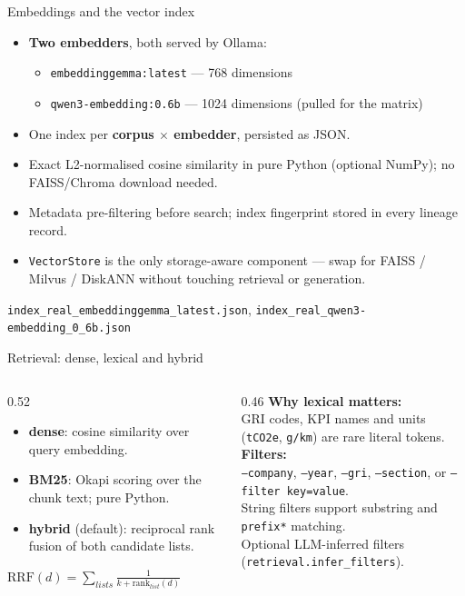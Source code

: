 \documentclass[aspectratio=169]{beamer}
\begin{document}
\begin{frame}{Embeddings and the vector index}
  \begin{itemize}
    \item \textbf{Two embedders}, both served by Ollama:
      \begin{itemize}
        \item \texttt{embeddinggemma:latest} --- 768 dimensions
        \item \texttt{qwen3-embedding:0.6b} --- 1024 dimensions (pulled for the matrix)
      \end{itemize}
    \item One index per \textbf{corpus $\times$ embedder}, persisted as JSON.
    \item Exact L2-normalised cosine similarity in pure Python (optional NumPy); no FAISS/Chroma download needed.
    \item Metadata pre-filtering before search; index fingerprint stored in every lineage record.
    \item \texttt{VectorStore} is the only storage-aware component --- swap for FAISS / Milvus / DiskANN without touching retrieval or generation.
  \end{itemize}
  \vspace{1mm}
  \small \texttt{index\_real\_embeddinggemma\_latest.json}, \texttt{index\_real\_qwen3-embedding\_0\_6b.json}
\end{frame}

\begin{frame}{Retrieval: dense, lexical and hybrid}
  \begin{columns}[T]
    \begin{column}{0.52\textwidth}
      \begin{itemize}
        \item \textbf{dense}: cosine similarity over query embedding.
        \item \textbf{BM25}: Okapi scoring over the chunk text; pure Python.
        \item \textbf{hybrid} (default): reciprocal rank fusion of both candidate lists.
      \end{itemize}
      \scriptsize
      $\mathrm{RRF}(d)=\sum_{lists}\frac{1}{k+\mathrm{rank}_{list}(d)}$
    \end{column}
    \begin{column}{0.46\textwidth}
      \scriptsize
      \textbf{Why lexical matters:}\\
      GRI codes, KPI names and units (\texttt{tCO2e}, \texttt{g/km}) are rare literal tokens.\\
      \vspace{2mm}
      \textbf{Filters:}\\
      \texttt{--company}, \texttt{--year}, \texttt{--gri}, \texttt{--section}, or \texttt{--filter key=value}.\\
      String filters support substring and \texttt{prefix*} matching.\\
      Optional LLM-inferred filters (\texttt{retrieval.infer\_filters}).
    \end{column}
  \end{columns}
\end{frame}
\end{document}
